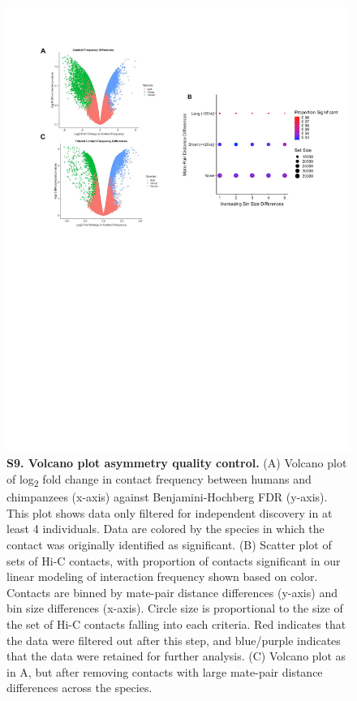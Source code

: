 \begin{figure}[!htb]
\centering
\includegraphics[width=6in]{img/figS9.pdf}
\caption[Volcano plot asymmetry quality control.]{\textbf{S9. Volcano plot asymmetry quality control.} (A) Volcano plot of log\textsubscript{2} fold change in contact frequency between humans and chimpanzees (x-axis) against Benjamini-Hochberg FDR (y-axis). This plot shows data only filtered for independent discovery in at least 4 individuals. Data are colored by the species in which the contact was originally identified as significant. (B) Scatter plot of sets of Hi-C contacts, with proportion of contacts significant in our linear modeling of interaction frequency shown based on color. Contacts are binned by mate-pair distance differences (y-axis) and bin size differences (x-axis). Circle size is proportional to the size of the set of Hi-C contacts falling into each criteria. Red indicates that the data were filtered out after this step, and blue/purple indicates that the data were retained for further analysis. (C) Volcano plot as in A, but after removing contacts with large mate-pair distance differences across the species.}
\label{fig:ch02-figS9}
\end{figure}

